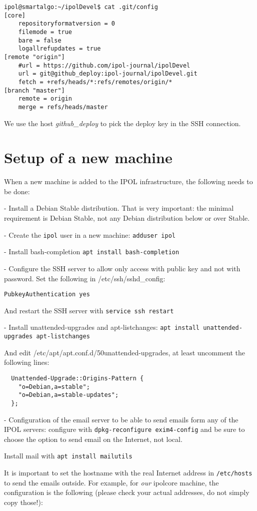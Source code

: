 \documentclass[a4paper,12pt]{article}
\begin{document}
\begin{verbatim}
ipol@smartalgo:~/ipolDevel$ cat .git/config
[core]
	repositoryformatversion = 0
	filemode = true
	bare = false
	logallrefupdates = true
[remote "origin"]
	#url = https://github.com/ipol-journal/ipolDevel
	url = git@github_deploy:ipol-journal/ipolDevel.git
	fetch = +refs/heads/*:refs/remotes/origin/*
[branch "master"]
	remote = origin
	merge = refs/heads/master
\end{verbatim}

We use the host \emph{github\_deploy} to pick the deploy key in the SSH connection.

\section{Setup of a new machine}
When a new machine is added to the IPOL infrastructure, the following needs to be done:

- Install a Debian Stable distribution. That is very important: the minimal requirement is Debian Stable, not any Debian distribution below or over Stable.

- Create the {\tt ipol} user in a new machine: {\tt adduser ipol}

- Install bash-completion {\tt apt install bash-completion}

- Configure the SSH server to allow only access with public key and not with password. Set the following in /etc/ssh/sshd\_config:

{\tt PubkeyAuthentication yes}

And restart the SSH server with {\tt service ssh restart}

- Install unattended-upgrades and apt-listchanges: {\tt apt install unattended-upgrades apt-listchanges}

And edit /etc/apt/apt.conf.d/50unattended-upgrades, at least uncomment the following lines:
\begin{verbatim}
  Unattended-Upgrade::Origins-Pattern {
    "o=Debian,a=stable";
    "o=Debian,a=stable-updates";
  };
\end{verbatim}

- Configuration of the email server to be able to send emails form any of the IPOL servers: configure with {\tt dpkg-reconfigure exim4-config} and be sure to choose the option to send email on the Internet, not local.

Install mail with {\tt apt install mailutils}

It is important to set the hostname with the real Internet address in {\tt /etc/hosts} to send the emails outside. For example, for \emph{our} ipolcore machine, the configuration is the following (please check your actual addresses, do not simply copy those!):
\end{document}
